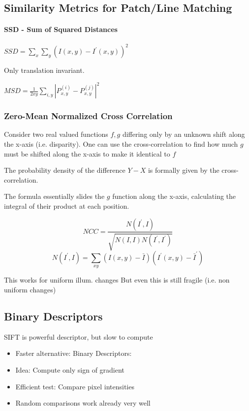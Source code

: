 \subsection{ Similarity Metrics for Patch/Line Matching}

\paragraph*{ SSD - Sum of Squared Distances}

$SSD = \sum_x \sum_y (I(x,y) - I^\prime(x,y))^2$

Only translation invariant.

$MSD=\frac{1}{2xy} \sum_{i,y}\left|P_{x,y}^{(i)} - P^{(j)}_{x,y}\right|^2$


\subsubsection{Zero-Mean Normalized Cross Correlation}
Consider two real valued functions  $f,g$  differing only by an unknown shift along the x-axis (i.e. disparity). One can use the cross-correlation to find how much $g$ must be shifted along the x-axis to make it identical to $f$ 

The probability density of the difference $Y-X$ is formally given by the cross-correlation.

The formula essentially slides the $g$ function along the x-axis, calculating the integral of their product at each position.

$$ NCC = \frac{N(I^\prime,I)}{\sqrt{N(I,I)N(I^\prime,I^\prime)}} $$
$$ N(I^\prime,I) = \sum_{xy} (I(x,y) - \bar I )(I^\prime(x,y) - \bar I^\prime ) $$

This works for uniform illum. changes
But even this is still fragile (i.e. non uniform changes)

\subsection{Binary Descriptors}

SIFT is powerful descriptor, but slow to compute
\begin{itemize}
\item Faster alternative: Binary Descriptors:
\item Idea: Compute only sign of gradient
\item Efficient test: Compare pixel intensities
\item Random comparisons work already very well
\end{itemize}

